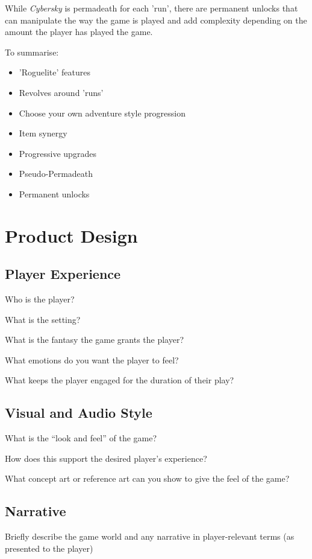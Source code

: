 \documentclass{scrartcl}
\begin{document}
While \emph{Cybersky} is permadeath for each 'run', there are permanent unlocks that can manipulate the way the game is played and add complexity depending on the amount the player has played the game.

To summarise:

\begin{itemize}
  \item 'Roguelite' features
  \item Revolves around 'runs'
  \item Choose your own adventure style progression
  \item Item synergy
  \item Progressive upgrades
  \item Pseudo-Permadeath
  \item Permanent unlocks
\end{itemize}

\section{
  Product Design
 }

\subsection{Player Experience}

Who is the player?

What is the setting?

What is the fantasy the game grants the player?

What emotions do you want the player to feel?

What keeps the player engaged for the duration of their play?

\subsection{Visual and Audio Style}

What is the “look and feel” of the game?

How does this support the desired player’s experience?

What concept art or reference art can you show to give the feel of the game?

\subsection{Narrative}

Briefly describe the game world and any narrative in player-relevant terms (as presented to the player)
\end{document}
